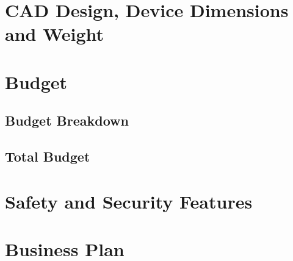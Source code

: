 \documentclass[12pt,a4paper]{article}
\begin{document}
 \section{CAD Design, Device Dimensions and Weight}
  \begin{flushleft}
   
  \end{flushleft}

 \section{Budget}
  \subsection{Budget Breakdown}
  \subsection{Total Budget}
  
  
 \section{Safety and Security Features}
  \begin{flushleft}
   
  \end{flushleft}

 \section{Business Plan}
 \begin{flushleft}
  
 \end{flushleft}
\end{document}
